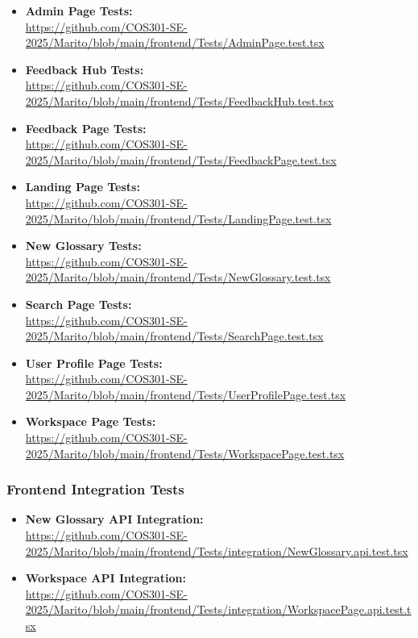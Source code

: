 \documentclass[12pt,a4paper]{article}
\begin{document}
\begin{itemize}
    \item \textbf{Admin Page Tests:} \\
    \url{https://github.com/COS301-SE-2025/Marito/blob/main/frontend/Tests/AdminPage.test.tsx}
    
    \item \textbf{Feedback Hub Tests:} \\
    \url{https://github.com/COS301-SE-2025/Marito/blob/main/frontend/Tests/FeedbackHub.test.tsx}
    
    \item \textbf{Feedback Page Tests:} \\
    \url{https://github.com/COS301-SE-2025/Marito/blob/main/frontend/Tests/FeedbackPage.test.tsx}
    
    \item \textbf{Landing Page Tests:} \\
    \url{https://github.com/COS301-SE-2025/Marito/blob/main/frontend/Tests/LandingPage.test.tsx}
    
    \item \textbf{New Glossary Tests:} \\
    \url{https://github.com/COS301-SE-2025/Marito/blob/main/frontend/Tests/NewGlossary.test.tsx}
    
    \item \textbf{Search Page Tests:} \\
    \url{https://github.com/COS301-SE-2025/Marito/blob/main/frontend/Tests/SearchPage.test.tsx}
    
    \item \textbf{User Profile Page Tests:} \\
    \url{https://github.com/COS301-SE-2025/Marito/blob/main/frontend/Tests/UserProfilePage.test.tsx}
    
    \item \textbf{Workspace Page Tests:} \\
    \url{https://github.com/COS301-SE-2025/Marito/blob/main/frontend/Tests/WorkspacePage.test.tsx}
\end{itemize}

\subsubsection{Frontend Integration Tests}

\begin{itemize}
    \item \textbf{New Glossary API Integration:} \\
    \url{https://github.com/COS301-SE-2025/Marito/blob/main/frontend/Tests/integration/NewGlossary.api.test.tsx}
    
    \item \textbf{Workspace API Integration:} \\
    \url{https://github.com/COS301-SE-2025/Marito/blob/main/frontend/Tests/integration/WorkspacePage.api.test.tsx}
\end{itemize}
\end{document}
